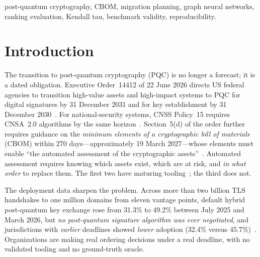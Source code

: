 \documentclass[conference,10pt]{IEEEtran}
\newcommand{\tb}{\tau_b}
\begin{document}
\begin{abstract}
tied group yields $m^2/4$ new distinguishable pairs for $m$ labels, so the ceiling is cheapest to
repair where ties are densest); an eight-mode construct-validity checklist; a claim ledger; and a
reporting standard: report the ceiling, the number of effective pairs, and attainment---not just
$\tb$. We further show that cross-corpus checkpoint comparisons are routinely contaminated: on one
fixed held-out split, two earlier checkpoints had trained on $87.6\%$ and $92.2\%$ of the evaluation
files, so only the zero-overlap checkpoint's F1 ($0.8966$) is interpretable, and neither more epochs
nor more data raises it---consistent with a ceiling set by label noise. On designed estates the ceiling is governed by tie concentration rather than estate size
($0.43$ at $90\%$ key-size monoculture for $n$ from 10 to 5{,}000), and about two expert labels
per asset suffice to raise it to $0.90$.
\end{abstract}

\begin{IEEEkeywords}
post-quantum cryptography, CBOM, migration planning, graph neural networks, ranking evaluation,
Kendall tau, benchmark validity, reproducibility.
\end{IEEEkeywords}

\section{Introduction}

The transition to post-quantum cryptography (PQC) is no longer a forecast; it is a dated
obligation. Executive Order~14412 of 22 June 2026 directs US federal agencies to transition
high-value assets and high-impact systems to PQC for digital signatures by 31 December 2031
and for key establishment by 31 December 2030~\cite{eo14412}. For national-security systems,
CNSS Policy~15 requires CNSA~2.0 algorithms by the same horizon~\cite{cnssp15}. Section~5(d) of
the order further requires guidance on the \emph{minimum elements of a cryptographic bill of
materials} (CBOM) within 270 days---approximately 19 March 2027---whose elements must enable
``the automated assessment of the cryptographic assets''~\cite{eo14412}. Automated assessment
requires knowing which assets exist, which are at risk, and \emph{in what order} to replace
them. The first two have maturing tooling~\cite{cyclonedx,ibm_cbom,hess2026,cryptoscope}; the
third does not.

The deployment data sharpen the problem. Across more than two billion TLS handshakes to one
million domains from eleven vantage points, default hybrid post-quantum key exchange rose from
31.3\% to 49.2\% between July 2025 and March 2026, but \emph{no post-quantum signature
algorithm was ever negotiated}, and jurisdictions with \emph{earlier} deadlines showed
\emph{lower} adoption (32.4\% versus 45.7\%)~\cite{mindthegap2026}. Organizations are making
real ordering decisions under a real deadline, with no validated tooling and no ground-truth
oracle.
\end{document}
